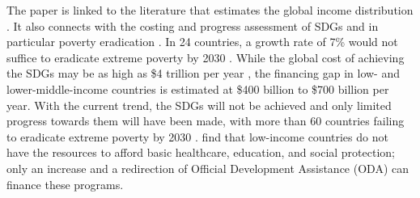 The paper is linked to the literature that estimates the global income distribution \citep{pinkovskiy_parametric_2009,anand_chapter_2015,lahoti_global_2016,lakner_global_2016,gradin_trends_2021,jorda_global_2019,alvaredo_methods_2021,milanovic_three_2024}. 
It also connects with the costing and progress assessment of SDGs and in particular poverty eradication \citep{schmidt-traub_investment_2015,rozenberg_beyond_2019,sdsn_sdg_2019,manuel_financing_2020,vorisek_understanding_2020,unctad_estimating_2021,un_sustainable_2022}. In 24 countries, a growth rate of 7\% would not suffice to eradicate extreme poverty by 2030 \citep{unctad_estimating_2021}. While the global cost of achieving the SDGs may be as high as \$4 trillion per year \citep{unctad_world_2023}, %
the financing gap in low- and lower-middle-income countries is estimated at \$400 billion \citep{sdsn_sdg_2019} %
to \$700 billion \citep{kharas_building_2019} %
per year. With the current trend, the SDGs will not be achieved and only limited progress towards them will have been made, with more than 60 countries failing to eradicate extreme poverty by 2030 \citep{moyer_are_2020}. %
\cite{manuel_financing_2018} find that low-income countries do not have the resources to afford basic healthcare, education, and social protection; only an increase and a redirection of Official Development Assistance (ODA) can finance these programs. 

